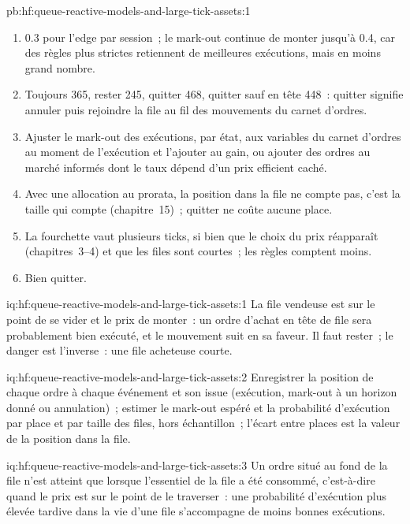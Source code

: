 \begin{solution}{pb:hf:queue-reactive-models-and-large-tick-assets:1}
\begin{enumerate}
\item 0.3 pour l'edge par session~; le mark-out continue de monter jusqu'à 0.4, car des règles plus strictes retiennent de meilleures exécutions, mais en moins grand nombre.
\item Toujours 365, rester 245, quitter 468, quitter sauf en tête 448~: quitter signifie annuler puis rejoindre la file au fil des mouvements du carnet d'ordres.
\item Ajuster le mark-out des exécutions, par état, aux variables du carnet d'ordres au moment de l'exécution et l'ajouter au gain, ou ajouter des ordres au marché informés dont le taux
dépend d'un prix efficient caché.
\item Avec une allocation au prorata, la position dans la file ne compte pas, c'est la taille qui compte (chapitre~15)~; quitter ne coûte aucune place.
\item La fourchette vaut plusieurs ticks, si bien que le choix du prix réapparaît (chapitres~3--4) et que les files sont courtes~; les règles comptent moins.
\item Bien quitter.
\end{enumerate}
\end{solution}

\begin{solution}{iq:hf:queue-reactive-models-and-large-tick-assets:1}
La file vendeuse est sur le point de se vider et le prix de monter~: un ordre d'achat en tête de file sera probablement bien exécuté, et le mouvement suit en sa faveur. Il faut rester~; le
danger est l'inverse~: une file acheteuse courte.
\end{solution}

\begin{solution}{iq:hf:queue-reactive-models-and-large-tick-assets:2}
Enregistrer la position de chaque ordre à chaque événement et son issue (exécution, mark-out à un horizon donné ou annulation)~; estimer le mark-out espéré et la probabilité
d'exécution par place et par taille des files, hors échantillon~; l'écart entre places est la valeur de la position dans la file.
\end{solution}

\begin{solution}{iq:hf:queue-reactive-models-and-large-tick-assets:3}
Un ordre situé au fond de la file n'est atteint que lorsque l'essentiel de la file a été consommé, c'est-à-dire quand le prix est sur le point de le traverser~: une probabilité d'exécution plus élevée
tardive dans la vie d'une file s'accompagne de moins bonnes exécutions.
\end{solution}

